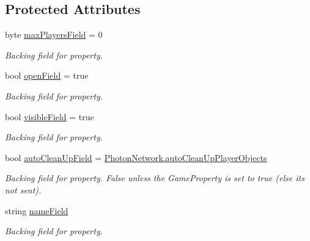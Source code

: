 \subsection*{Protected Attributes}
\begin{DoxyCompactItemize}
\item 
byte \hyperlink{class_room_info_a46f07a9998e906a0adb4f45bb94f1994}{max\+Players\+Field} = 0
\begin{DoxyCompactList}\small\item\em Backing field for property.\end{DoxyCompactList}\item 
bool \hyperlink{class_room_info_a6ee1a8dc240cfc8f983192806e751f14}{open\+Field} = true
\begin{DoxyCompactList}\small\item\em Backing field for property.\end{DoxyCompactList}\item 
bool \hyperlink{class_room_info_a9fe8d4b4891f2d6e57dcd774048f2545}{visible\+Field} = true
\begin{DoxyCompactList}\small\item\em Backing field for property.\end{DoxyCompactList}\item 
bool \hyperlink{class_room_info_ad4cd6791bdb87d9af9b2bf37bee89c90}{auto\+Clean\+Up\+Field} = \hyperlink{class_photon_network_a6c6fb3cd57d7e2a13d1fc354db0c1fd7}{Photon\+Network.\+auto\+Clean\+Up\+Player\+Objects}
\begin{DoxyCompactList}\small\item\em Backing field for property. False unless the Game\+Property is set to true (else it\textquotesingle{}s not sent).\end{DoxyCompactList}\item 
string \hyperlink{class_room_info_a4a091adee00339d328654b93821ba49e}{name\+Field}
\begin{DoxyCompactList}\small\item\em Backing field for property.\end{DoxyCompactList}\end{DoxyCompactItemize}
